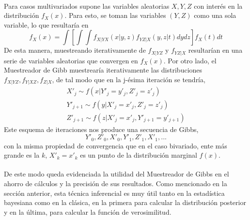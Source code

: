 \\
Para casos multivariados \cite{casella1992explaining} supone las variables aleatorias $X,Y,Z$ con inter\'es en la distribuci\'on $f_X(x)$. Para esto, se toman las variables $(Y,Z)$ como una sola variable, lo que resultar\'ia en\\
\[f_X(x)= \int [ \int \int f_{X|YX}(x|y,z)f_{YZ|X}(y,z|t)dy dz] f_X(t) dt\]
De esta manera, muestreando iterativamente de $f_{X|YZ}$ y $f_{YZ|X}$ resultar\'ian en una serie de variables aleatorias que convergen en $f_X(x)$. Por otro lado, el Muestreador de Gibb muestrear\'ia iterativamente las distribuciones $f_{X|YZ}, f_{Y|XZ}, f_{Z|X}$, de tal modo que en la j-\'esima iteraci\'on se tendr\'ia,\\
\begin{align*}
X'_j \sim f(x|Y'_j = y'_j, Z'_j=z'_j)\\
Y'_{j+1} \sim f(y|X'_j=x'_j, Z'_j=z'_j)\\
Z'_{j+1} \sim f(z|X'_j=x'_j, Y'_{j+1}=y'_{j+1})
\end{align*}
Este esquema de iteraciones nos produce una secuencia de Gibbs,\\
\[Y'_0,Z'_0,X'_0,Y'_1,Z'_1,X'_1,...\]
con la misma propiedad de convergencia que en el caso bivariado, ente m\'as grande es la $k$, $X'_k=x'_k$ es un punto de la distribuci\'on marginal $f(x)$.\\
\\
De este modo queda evidenciada la utilidad del Muestreador de Gibbs en el ahorro de c\'alculos y la precisi\'on de sus resultados. Como mencionado en la secci\'on anterior, esta t\'ecnica inferencial es muy \'util tanto en la estad\'istica bayesiana como en la cl\'asica, en la primera para calcular la distribuci\'on posterior y en la \'ultima, para calcular la funci\'on de verosimilitud.\\
